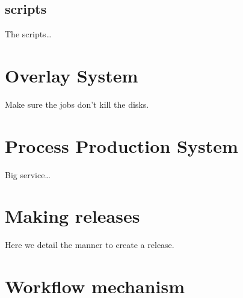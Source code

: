 \documentclass[a4paper,12pt]{article}
\begin{document}
\subsection{scripts}\label{corescripts}
The scripts\ldots

\section{Overlay System}\label{overlaysys}
Make sure the jobs don't kill the disks.

\section{Process Production System}\label{processprodsys}
Big service\ldots

\section{Making releases}\label{makingrelease}
Here we detail the manner to create a release.

\section{Workflow mechanism}\label{workflowsys}
\end{document}
